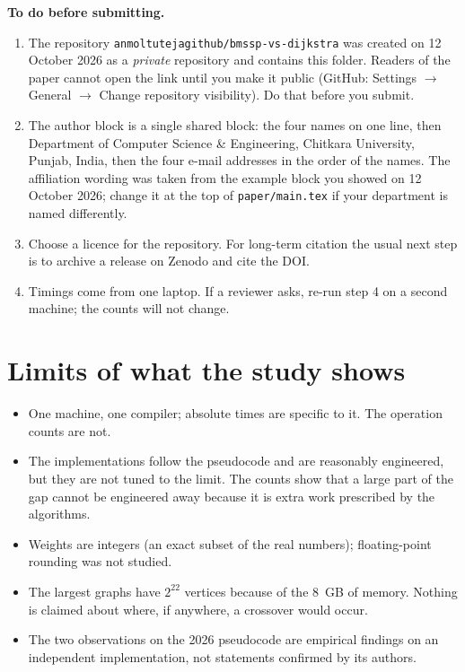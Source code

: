\documentclass[11pt,a4paper]{article}
\newcommand{\code}[1]{\texttt{#1}}
\begin{document}
\textbf{To do before submitting.}
\begin{enumerate}
\item The repository \code{anmoltutejagithub/bmssp-vs-dijkstra} was created on 12 October 2026 as a \emph{private} repository and contains this folder. Readers of the paper cannot open the link until you make it public (GitHub: Settings $\rightarrow$ General $\rightarrow$ Change repository visibility). Do that before you submit.
\item The author block is a single shared block: the four names on one line, then Department of Computer Science \& Engineering, Chitkara University, Punjab, India, then the four e-mail addresses in the order of the names. The affiliation wording was taken from the example block you showed on 12 October 2026; change it at the top of \code{paper/main.tex} if your department is named differently.
\item Choose a licence for the repository. For long-term citation the usual next step is to archive a release on Zenodo and cite the DOI.
\item Timings come from one laptop. If a reviewer asks, re-run step 4 on a second machine; the counts will not change.
\end{enumerate}

\section{Limits of what the study shows}
\begin{itemize}
\item One machine, one compiler; absolute times are specific to it. The operation counts are not.
\item The implementations follow the pseudocode and are reasonably engineered, but they are not tuned to the limit. The counts show that a large part of the gap cannot be engineered away because it is extra work prescribed by the algorithms.
\item Weights are integers (an exact subset of the real numbers); floating-point rounding was not studied.
\item The largest graphs have $2^{22}$ vertices because of the 8~GB of memory. Nothing is claimed about where, if anywhere, a crossover would occur.
\item The two observations on the 2026 pseudocode are empirical findings on an independent implementation, not statements confirmed by its authors.
\end{itemize}
\end{document}
